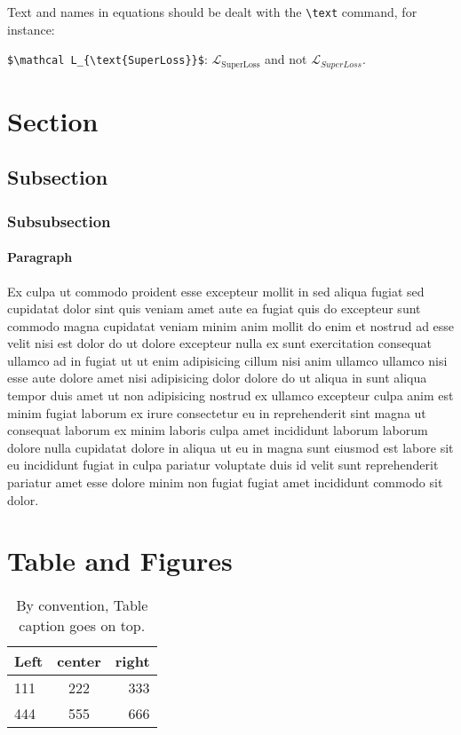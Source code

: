 \documentclass[twoside,11pt]{article}
\begin{document}
Text and names in equations should be dealt with the \verb|\text| command, for instance:

\noindent \verb|$\mathcal L_{\text{SuperLoss}}$|: $\mathcal L_{\text{SuperLoss}}$ and not $\mathcal L_{SuperLoss}$.



\section{Section}
\subsection{Subsection}
\subsubsection{Subsubsection}
\paragraph{Paragraph} Ex culpa ut commodo proident esse excepteur mollit in sed aliqua fugiat sed cupidatat dolor sint quis veniam amet aute ea fugiat quis do excepteur sunt commodo magna cupidatat veniam minim anim mollit do enim et nostrud ad esse velit nisi est dolor do ut dolore excepteur nulla ex sunt exercitation consequat ullamco ad in fugiat ut ut enim adipisicing cillum nisi anim ullamco ullamco nisi esse aute dolore amet nisi adipisicing dolor dolore do ut aliqua in sunt aliqua tempor duis amet ut non adipisicing nostrud ex ullamco excepteur culpa anim est minim fugiat laborum ex irure consectetur eu in reprehenderit sint magna ut consequat laborum ex minim laboris culpa amet incididunt laborum laborum dolore nulla cupidatat dolore in aliqua ut eu in magna sunt eiusmod est labore sit eu incididunt fugiat in culpa pariatur voluptate duis id velit sunt reprehenderit pariatur amet esse dolore minim non fugiat fugiat amet incididunt commodo sit dolor.

\section{Table and Figures}

\begin{table}[h] %
	\centering
	\caption{By convention, Table caption goes on top.}
	\begin{tabular}{lcr}
		\textbf{Left} & \textbf{center} & \textbf{right} \\
		\hline
		111 & 222 & 333 \\
		444 & 555 & 666
	\end{tabular}
\end{table}
\end{document}
